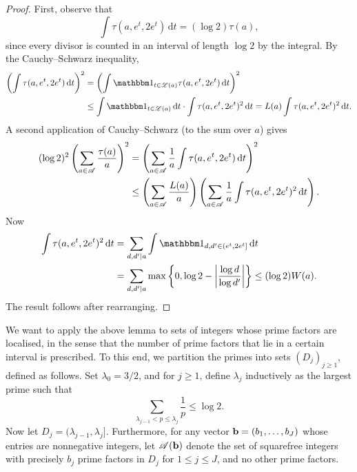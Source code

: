 \begin{proof}
    First, observe that 
    \begin{equation*}
        \int \tau(a, e^t, 2 e^t)\, \mathrm{d} t = (\log 2) \tau(a),
    \end{equation*}
    since every divisor is counted in an interval of length $\log 2$ by the integral. 
    By the Cauchy--Schwarz inequality, 
    \begin{align*}
        \left(\int \tau(a, e^t, 2 e^t)\, \mathrm{d} t\right)^2 &= \left(\int \ind{t \in \mcL(a)} \tau(a, e^t, 2 e^t)\, \mathrm{d} t \right)^2 \\
            &\le \int \ind{t \in \mcL(a)}\, \mathrm{d}t \cdot  \int \tau(a, e^t, 2 e^t)^2\, \mathrm{d} t
            = L(a) \int \tau(a, e^t, 2 e^t)^2\, \mathrm{d} t.
    \end{align*}
    A second application of Cauchy--Schwarz (to the sum over $a$) gives
    \begin{align*}
        (\log 2)^2\left( \sum \limits_{a \in \mathscr{A}} \frac{\tau(a)}{a} \right)^2 
            &= \left( \sum \limits_{a \in \mathscr{A}} \frac{1}{a} \int \tau(a, e^t, 2 e^t)\, \mathrm{d} t \right)^2 \\
            &\le \left( \sum \limits_{a \in \mathscr{A}} \frac{L(a)}{a} \right) \left( \sum \limits_{a \in \mathscr{A}}\frac{1}{a} \int \tau(a, e^t, 2 e^t)^2\, \mathrm{d} t \right).
    \end{align*}
    Now
    \begin{align*}
        \int \tau(a, e^t, 2 e^t)^2\, \mathrm{d} t 
            &= \sum \limits_{d, d' \mid a} \int \ind{d, d' \in (e^t, 2e^t]}\, \mathrm{d}t \\
            &= \sum \limits_{d, d' \mid a} \max \Set{0, \log 2 - \left| \frac{\log d}{\log d'} \right|} 
            \le (\log 2) W(a).
    \end{align*}
    The result follows after rearranging.
\end{proof}

We want to apply the above lemma to sets of integers whose prime factors are localised, in the sense that the number of prime factors that lie in a certain interval is prescribed. 
To this end, we partition the primes into sets $(D_j)_{j \ge 1}$, defined as follows. 
Set $\lambda_0 = 3/2$, and for $j \ge 1$, define $\lambda_j$ inductively as the largest prime such that
\begin{equation} \label{eq:definition-of-lambda-j}
    \sum \limits_{\lambda_{j - 1} < p \le \lambda_j} \frac{1}{p} \le \log 2.
\end{equation}
Now let $D_j = (\lambda_{j - 1}, \lambda_j]$.
Furthermore, for any vector $\mathbf{b} = (b_1, \dots, b_J)$ whose entries are nonnegative integers, let $\mathscr{A} (\mathbf{b})$ denote the set of squarefree integers with precisely $b_j$ prime factors in $D_j$ for $1 \le j \le J$, and no other prime factors.

